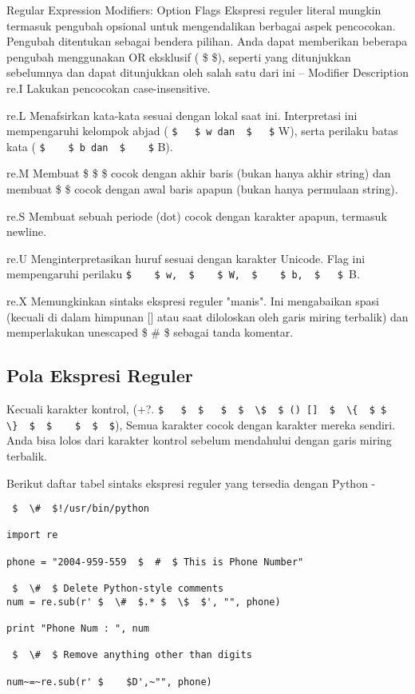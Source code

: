 \begin {enumerate}
\begin {enumerate}
Regular Expression Modifiers: Option Flags
Ekspresi reguler literal mungkin termasuk pengubah opsional untuk mengendalikan berbagai aspek pencocokan. Pengubah ditentukan sebagai bendera pilihan. Anda dapat memberikan beberapa pengubah menggunakan OR eksklusif ( \$   \$), seperti yang ditunjukkan sebelumnya dan dapat ditunjukkan oleh salah satu dari ini – Modifier Description
re.I
Lakukan pencocokan case-insensitive.

re.L
Menafsirkan kata-kata sesuai dengan lokal saat ini. Interpretasi ini mempengaruhi kelompok abjad ( \verb|$   $ w dan  $   $| W), serta perilaku batas kata ( \verb|$    $ b dan  $    $| B).

re.M
Membuat  \$  \$  \$ cocok dengan akhir baris (bukan hanya akhir string) dan membuat  \$   \$ cocok dengan awal baris apapun (bukan hanya permulaan string).

re.S
Membuat sebuah periode (dot) cocok dengan karakter apapun, termasuk newline.

re.U
Menginterpretasikan huruf sesuai dengan karakter Unicode. Flag ini mempengaruhi perilaku  \verb|$    $ w,  $    $ W,  $    $ b,  $   $ |B.

re.X
Memungkinkan sintaks ekspresi reguler "manis". Ini mengabaikan spasi (kecuali di dalam himpunan [] atau saat diloloskan oleh garis miring terbalik) dan memperlakukan unescaped  \$  \#  \$ sebagai tanda komentar.

\subsection{Pola Ekspresi Reguler}
Kecuali karakter kontrol, (+?.  \verb|$   $  $   $  $  \$  $ () []  $  \{  $ $  \}  $  $    $  $  $|), Semua karakter cocok dengan karakter mereka sendiri. Anda bisa lolos dari karakter kontrol sebelum mendahului dengan garis miring terbalik.

Berikut daftar tabel sintaks ekspresi reguler yang tersedia dengan Python -
\begin{verbatim}
 $  \#  $!/usr/bin/python

import re

phone = "2004-959-559  $  #  $ This is Phone Number"

 $  \#  $ Delete Python-style comments
num = re.sub(r' $  \#  $.* $  \$  $', "", phone)

print "Phone Num : ", num

 $  \#  $ Remove anything other than digits

num~=~re.sub(r' $    $D',~"", phone)


\end{verbatim}
\end{enumerate}
\end{enumerate}
